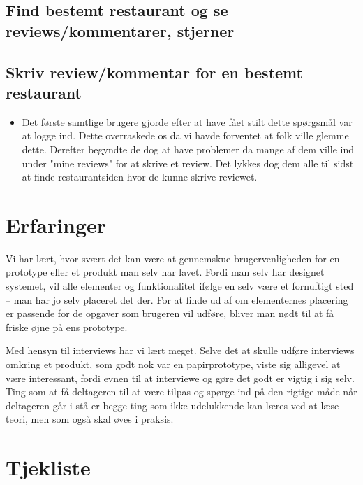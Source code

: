 \documentclass[a4paper, 12pt]{article}
\begin{document}
\subsection{Find bestemt restaurant og se reviews/kommentarer, stjerner}
\begin{itemize}
\end{itemize}

\subsection{Skriv review/kommentar for en bestemt restaurant}
\begin{itemize}
\item Det første samtlige brugere gjorde efter at have fået stilt dette spørgsmål
var at logge ind. Dette overraskede os da vi havde forventet at folk ville glemme
dette. Derefter begyndte de dog at have problemer da mange af dem ville ind under
"mine reviews" for at skrive et review. Det lykkes dog dem alle til sidst at finde
restaurantsiden hvor de kunne skrive reviewet.
\end{itemize}


\section{Erfaringer}
\label{sec:Erfaringer}

Vi har lært, hvor svært det kan være at gennemskue brugervenligheden for en prototype eller et produkt man selv har lavet. Fordi man selv har designet systemet, vil alle elementer og funktionalitet ifølge en selv være et fornuftigt sted -- man har jo selv placeret det der. For at finde ud af om elementernes placering er passende for de opgaver som brugeren vil udføre, bliver man nødt til at få friske øjne på ens prototype. 

Med hensyn til interviews har vi lært meget. Selve det at skulle udføre interviews omkring et produkt, som godt nok var en papirprototype, viste sig alligevel at være interessant, fordi evnen til at interviewe og gøre det godt er vigtig i sig selv. Ting som at få deltageren til at være tilpas og spørge ind på den rigtige måde når deltageren går i stå er begge ting som ikke udelukkende kan læres ved at læse teori, men som også skal øves i praksis.
\clearpage
\appendix

\section{Tjekliste}
\end{document}
